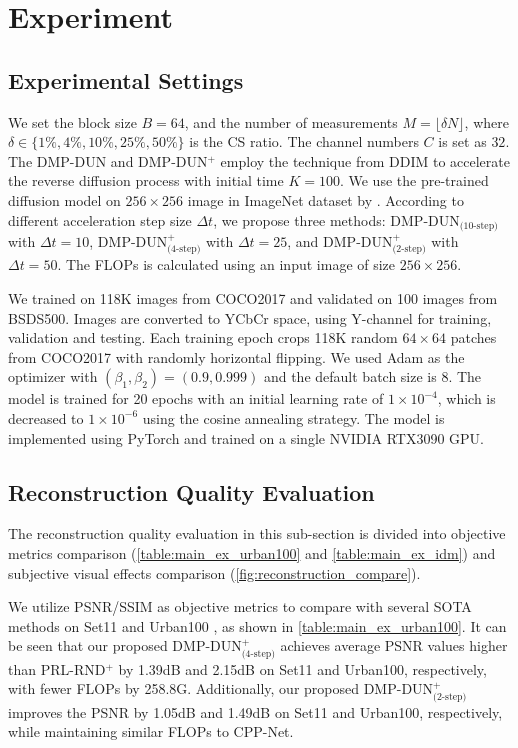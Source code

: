 \documentclass[10pt,twocolumn,letterpaper]{article}
\begin{document}
\section{Experiment}

\subsection{Experimental Settings} \label{subsec:ex_setting}
We set the block size $B=64$, and the number of measurements $M=\lfloor \delta N \rfloor$, where $\delta \in \{ 1\%, 4\%, 10\%, 25\%, 50\% \}$ is the CS ratio. The channel numbers $C$ is set as $32$. The DMP-DUN and DMP-DUN$^+$ employ the technique from DDIM\cite{DBLP:conf/iclr/SongME21} to accelerate the reverse diffusion process with initial time $K=100$. We use the pre-trained diffusion model on $256 \times 256$ image in ImageNet dataset by \cite{DBLP:conf/nips/DhariwalN21}.  According to different acceleration step size $\Delta t$, we propose three methods: DMP-DUN$_\text{(10-step)}$ with $\Delta t=10$, DMP-DUN$^+_\text{(4-step)}$ with $\Delta t=25$, and DMP-DUN$^+_\text{(2-step)}$ with $\Delta t=50$. The FLOPs is calculated using an input image of size $256 \times 256$.

We trained on 118K images from COCO2017\cite{cocodataset} and validated on 100 images from BSDS500\cite{arbelaez2010contour}. Images are converted to YCbCr space, using Y-channel for training, validation and testing. Each training epoch crops 118K random $64\times 64$ patches from COCO2017 with randomly horizontal flipping. We used Adam\cite{kingma2014adam} as the optimizer with $(\beta_1, \beta_2)=(0.9, 0.999)$ and the default batch size is 8. The model is trained for 20 epochs with an initial learning rate of $1\times 10^{-4}$, which is decreased to $1\times 10^{-6}$ using the cosine annealing strategy\cite{Chen2022FSOINETFO, Loshchilov2016SGDRSG}. The model is implemented using PyTorch and trained on a single NVIDIA RTX3090 GPU.


\subsection{Reconstruction Quality Evaluation}
The reconstruction quality evaluation in this sub-section is divided into objective metrics comparison (\cref{table:main_ex_urban100} and \cref{table:main_ex_idm}) and subjective visual effects comparison (\cref{fig:reconstruction_compare}).

We utilize PSNR/SSIM as objective metrics to compare with several SOTA methods on Set11 \cite{kulkarni2016reconnet} and Urban100 \cite{Dong2018DenoisingPD}, as shown in \cref{table:main_ex_urban100}. It can be seen that our proposed DMP-DUN$^+_\text{(4-step)}$ achieves average PSNR values higher than PRL-RND$^+$\cite{DBLP:journals/ijcv/ChenSXZ23} by 1.39dB and 2.15dB on Set11 and Urban100, respectively, with fewer FLOPs by 258.8G. Additionally, our proposed DMP-DUN$^+_\text{(2-step)}$ improves the PSNR by 1.05dB and 1.49dB on Set11 and Urban100, respectively, while maintaining similar FLOPs to CPP-Net\cite{guoCPPNet2024}.
\end{document}
